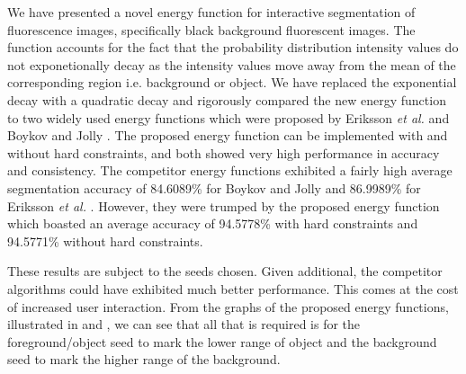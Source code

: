 We have presented a novel energy function for interactive segmentation of fluorescence images, specifically black background fluorescent images. The function accounts for the fact that the probability distribution intensity values do not exponetionally decay as the intensity values move away from the mean of the corresponding region i.e. background or object.
We have replaced the exponential decay with a quadratic decay and rigorously compared the new energy function to two widely used energy functions which were proposed by Eriksson \textit{et al.} \citep{Eriksson2006} and Boykov and Jolly \citep{Boykov2001_2}.
The proposed energy function can be implemented with and without hard constraints, and both showed very high performance in accuracy and consistency. The competitor energy functions exhibited a fairly high average segmentation accuracy of 84.6089\% for Boykov and Jolly \citep{Boykov2001_2} and 86.9989\% for Eriksson \textit{et al.} \citep{Eriksson2006}. However, they were trumped by the proposed energy function which boasted an average accuracy of 94.5778\% with hard constraints and 94.5771\% without hard constraints.

These results are subject to the seeds chosen. Given additional, the competitor algorithms could have exhibited much better performance. This comes at the cost of increased user interaction. From the graphs of the proposed energy functions, illustrated in  and , we can see that all that is required is for the foreground/object seed to mark the lower range of object and the background seed to mark the higher range of the background.



